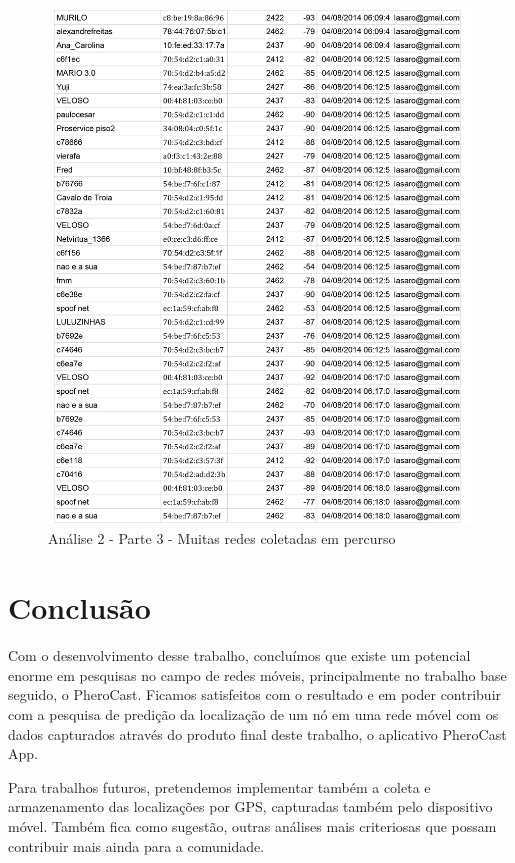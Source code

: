 \documentclass[12pt, %
openright, 
oneside,
a4paper,
brazil]{facom-ufu-abntex2}
\begin{document}
\begin{figure}[hbt]
  \includegraphics[scale=0.8]{analise203}
  \caption{Análise 2 - Parte 3 - Muitas redes coletadas em percurso}
\end{figure}


\chapter{Conclusão}
Com o desenvolvimento desse trabalho, concluímos que existe um potencial enorme em pesquisas no campo de redes móveis, principalmente no trabalho base seguido, o PheroCast. Ficamos satisfeitos com o resultado e em poder contribuir com a pesquisa de predição da localização de um nó em uma rede móvel com os dados capturados através do produto final deste trabalho, o aplicativo PheroCast App.

Para trabalhos futuros, pretendemos implementar também a coleta e armazenamento das localizações por GPS, capturadas também pelo dispositivo móvel. Também fica como sugestão, outras análises mais criteriosas que possam contribuir mais ainda para a comunidade.
\end{document}
